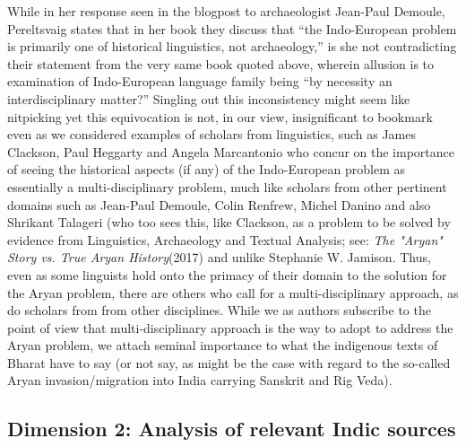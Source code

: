 While in her response seen in the blogpost to archaeologist Jean-Paul Demoule, Pereltsvaig states that in her book they discuss that “the Indo-European problem is primarily one of historical linguistics, not archaeology,” is she not contradicting their statement from the very same book quoted above, wherein allusion is to examination of Indo-European language family being “by necessity an interdisciplinary matter?” Singling out this inconsistency might seem like nitpicking yet this equivocation is not, in our view, insignificant to bookmark even as we considered examples of scholars from linguistics, such as James Clackson, Paul Heggarty and Angela Marcantonio who concur on the importance of seeing the historical aspects (if any) of the Indo-European problem as essentially a multi-disciplinary problem, much like scholars from other pertinent domains such as Jean-Paul Demoule, Colin Renfrew, Michel Danino and also Shrikant Talageri (who too sees this, like Clackson, as a problem to be solved by evidence from Linguistics, Archaeology and Textual Analysis; see: \textit{The "Aryan" Story vs. True Aryan History}(2017) and unlike Stephanie W. Jamison. Thus, even as some linguists hold onto the primacy of their domain to the solution for the Aryan problem, there are others who call for a multi-disciplinary approach, as do scholars from from other disciplines. While we as authors subscribe to the point of view that multi-disciplinary approach is the way to adopt to address the Aryan problem, we attach seminal importance to what the indigenous texts of Bharat have to say (or not say, as might be the case with regard to the so-called Aryan invasion/migration into India carrying Sanskrit and Rig Veda).


\subsection{Dimension 2: Analysis of relevant Indic sources}

